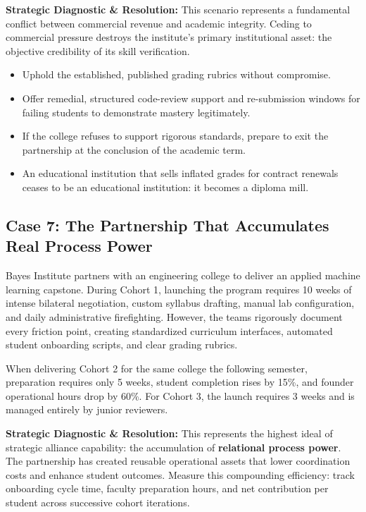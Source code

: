 \textbf{Strategic Diagnostic \& Resolution:} This scenario represents a fundamental conflict between commercial revenue and academic integrity. Ceding to commercial pressure destroys the institute's primary institutional asset: the objective credibility of its skill verification.
\begin{itemize}
\item Uphold the established, published grading rubrics without compromise.
\item Offer remedial, structured code-review support and re-submission windows for failing students to demonstrate mastery legitimately.
\item If the college refuses to support rigorous standards, prepare to exit the partnership at the conclusion of the academic term.
\item An educational institution that sells inflated grades for contract renewals ceases to be an educational institution: it becomes a diploma mill.
\end{itemize}

\subsection{Case 7: The Partnership That Accumulates Real Process Power}
\label{sec:case7_accumulating_process_power}

Bayes Institute partners with an engineering college to deliver an applied machine learning capstone. During Cohort 1, launching the program requires 10 weeks of intense bilateral negotiation, custom syllabus drafting, manual lab configuration, and daily administrative firefighting. However, the teams rigorously document every friction point, creating standardized curriculum interfaces, automated student onboarding scripts, and clear grading rubrics.

When delivering Cohort 2 for the same college the following semester, preparation requires only 5 weeks, student completion rises by 15\%, and founder operational hours drop by 60\%. For Cohort 3, the launch requires 3 weeks and is managed entirely by junior reviewers.

\textbf{Strategic Diagnostic \& Resolution:} This represents the highest ideal of strategic alliance capability: the accumulation of \textbf{relational process power}. The partnership has created reusable operational assets that lower coordination costs and enhance student outcomes. Measure this compounding efficiency: track onboarding cycle time, faculty preparation hours, and net contribution per student across successive cohort iterations.


